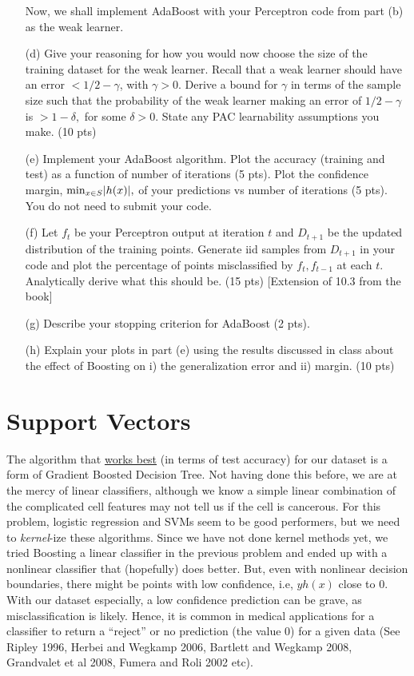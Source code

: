 \documentclass[12pt]{article}
\begin{document}
\begin{itemize}
		Now, we shall implement AdaBoost with your Perceptron code from part (b) as the weak learner. 
	\item[(d)] Give your reasoning for how you would now choose the size of the training dataset for the weak learner. Recall that a weak learner should have an error $< 1/2 - \gamma$, with $\gamma > 0$. Derive a bound for $\gamma$ in terms of the sample size such that the probability of the weak learner making an error of $1/2 - \gamma$ is $> 1- \delta,$ for some $\delta > 0.$ State any PAC learnability assumptions you make. (10 pts)
	\item[(e)] Implement your AdaBoost algorithm. Plot the accuracy (training and test) as a function of number of iterations (5 pts). Plot the confidence margin, ${\rm min}_{x\in S} |h(x)|,$ of your predictions vs number of iterations (5 pts). You do not need to submit your code.
	\item[(f)] Let $f_t$ be your Perceptron output at iteration $t$ and $D_{t+1}$ be the updated distribution of the training points. Generate iid samples from $D_{t+1}$ in your code and plot the percentage of points misclassified by $f_t, f_{t-1}$ at each $t$. Analytically derive what this should be. (15 pts) [Extension of 10.3 from the book]
	\item[(g)] Describe your stopping criterion for AdaBoost (2 pts).
	\item[(h)] Explain your plots in part (e) using the results discussed in class about the effect of Boosting on i) the generalization error and ii) margin.  (10 pts)


\end{itemize}

\section{Support Vectors}

The algorithm that \href{https://archive.ics.uci.edu/dataset/17/breast+cancer+wisconsin+diagnostic}{works best} (in terms of test accuracy) for our dataset is a form of Gradient Boosted Decision Tree. Not having done this before, we are at the mercy of linear classifiers, although we know a simple linear combination of the complicated cell features may not tell us if the cell is cancerous. For this problem, logistic regression and SVMs seem to be good performers, but we need to \emph{kernel}-ize these algorithms. Since we have not done kernel methods yet, we tried Boosting a linear classifier in the previous problem and ended up with a nonlinear classifier that (hopefully) does better.
But, even with nonlinear decision boundaries, there might be points with low confidence, i.e, $y h(x)$ close to 0. With our dataset especially, a low confidence prediction can be grave, as misclassification is likely. Hence, it is common in medical applications for a classifier to return a ``reject'' or no prediction (the value 0) for a given data (See Ripley 1996, Herbei and Wegkamp 2006, Bartlett and Wegkamp 2008, Grandvalet et al 2008, Fumera and Roli 2002 etc). 
\end{document}

